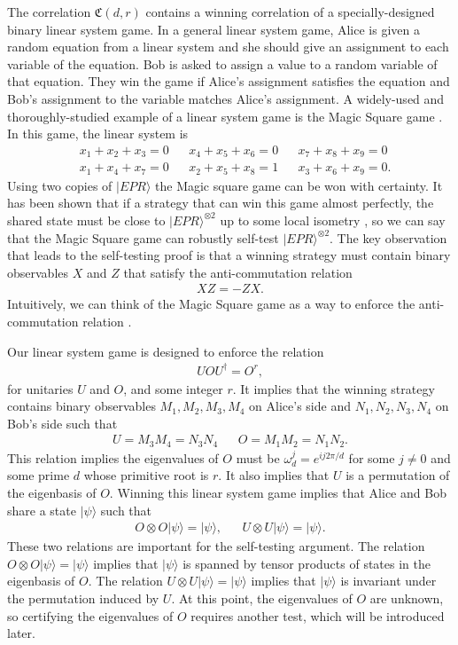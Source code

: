 \documentclass[11pt,letterpaper]{article}
\newcommand{\ket}[1]{|#1\rangle}
\newcommand{\x}{\otimes}
\newcommand{\ct}{^{\dagger}}
\newcommand{\1}{\mathbb{1}}
\newcommand{\fC}{\mathfrak{C}}
\theoremstyle{definition}
\begin{document}
The correlation $\fC(d,r)$ contains a winning correlation of a specially-designed binary linear system game.
In a general linear system game, Alice is given a random equation 
from a linear system and she
should give an assignment to each variable of the equation.
Bob is asked to assign a value to a random variable of that equation.
They win the game if Alice's assignment satisfies the equation and Bob's
assignment to the variable matches Alice's assignment.
A widely-used and thoroughly-studied example of a linear system game is
the Magic Square game \cite{magic_square}.
In this game, the linear system is
\begin{align*}
    &x_1 + x_2 + x_3 = 0 && x_4 + x_5 + x_6 = 0 &&
    x_7 + x_8 + x_9 = 0 \\
    &x_1 + x_4 + x_7 = 0 && x_2 + x_5 + x_8 = 1 &&
    x_3 + x_6 + x_9 = 0.
\end{align*}
Using two copies of $\ket{EPR}$
the Magic square game can be won with certainty.
It has been shown that if a strategy that can win this game almost perfectly, 
the shared state must be close to $\ket{EPR}^{\x 2}$ up to some local isometry \cite{wu2016}, 
so we can say that the Magic Square game can robustly self-test $\ket{EPR}^{\x 2}$.
The key observation that leads to the self-testing proof is that 
a winning strategy must contain binary observables $X$ and $Z$ that 
satisfy the anti-commutation relation 
\begin{align*}
    X Z = - Z X.
\end{align*}
Intuitively, we can think of the Magic Square game as a way to enforce the
anti-commutation relation \cite{coladan2017}.

Our linear system game is designed to enforce the relation 
\begin{align*}
    U O U\ct = O^r,
\end{align*}
for unitaries $U$ and $O$, and some integer $r$.
It implies that the winning strategy contains binary observables
$M_1, M_2, M_3, M_4$ on Alice's side and 
$N_1, N_2, N_3, N_4$ on Bob's side such that 
\begin{align*}
    U = M_3M_4 = N_3N_4 && O = M_1M_2 = N_1N_2.
\end{align*}
This relation implies the eigenvalues of $O$ must be $\omega_d^j = e^{ij2\pi/d}$ for some $j \neq 0$ and some prime $d$ whose primitive root is $r$. 
It also implies that $U$ is a permutation of the eigenbasis of $O$.
Winning this linear system game implies that Alice and Bob share a state
$\ket{\psi}$ such that
\begin{align*}
    O \x O \ket{\psi} = \ket{\psi}, && 
    U \x U \ket{\psi} = \ket{\psi}.
\end{align*}
These two relations are important for the self-testing argument.
The relation $O \x O \ket{\psi} = \ket{\psi}$ implies that $\ket{\psi}$
is spanned by tensor products of states in the eigenbasis of $O$.
The relation $U \x U \ket{\psi} = \ket{\psi}$ implies that $\ket{\psi}$ is invariant
under the permutation induced by $U$. 
At this point, the eigenvalues of $O$ are unknown, so
certifying the eigenvalues of $O$ requires another test, 
which will be introduced later.
\end{document}
